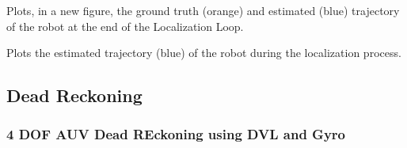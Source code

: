 \documentclass[letterpaper,10pt,english]{sphinxmanual}
\begin{document}
\begin{fulllineitems}
\begin{fulllineitems}
\begin{quote}
\begin{description}
\begin{itemize}
\end{itemize}

\end{description}\end{quote}

\end{fulllineitems}


\begin{fulllineitems}
\label{\detokenize{Localization:Localization.Localization.PlotXY}}
\pysigstartsignatures
{}
\pysigstopsignatures
\sphinxAtStartPar
Plots, in a new figure, the ground truth (orange) and estimated (blue) trajectory of the robot at the end of the Localization Loop.

\end{fulllineitems}


\begin{fulllineitems}
\label{\detokenize{Localization:Localization.Localization.PlotTrajectory}}
\pysigstartsignatures
{}
\pysigstopsignatures
\sphinxAtStartPar
Plots the estimated trajectory (blue) of the robot during the localization process.

\end{fulllineitems}


\end{fulllineitems}



\subsection{Dead Reckoning}
\label{\detokenize{Localization_index:dead-reckoning}}
\sphinxstepscope


\subsubsection{4 DOF AUV Dead REckoning using DVL and Gyro}
\label{\detokenize{DRLocalization:dof-auv-dead-reckoning-using-dvl-and-gyro}}\label{\detokenize{DRLocalization::doc}}
\begin{figure}[htbp]
\centering

\noindent{}
\end{figure}
\end{document}
